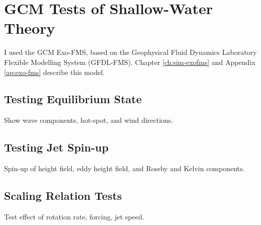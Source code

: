 \section{GCM Tests of Shallow-Water Theory}

I used the GCM Exo-FMS, based on the Geophysical Fluid Dynamics Laboratory Flexible Modelling System (GFDL-FMS). Chapter \ref{ch:sim-exofms} and Appendix \ref{ap:exo-fms} describe this model.

\subsection*{Testing Equilibrium State}

Show wave components, hot-spot, and wind directions.

\subsection*{Testing Jet Spin-up}

Spin-up of height field, eddy height field, and Rossby and Kelvin components.

\subsection*{Scaling Relation Tests}

Test effect of rotation rate, forcing, jet speed.










% 
% 
